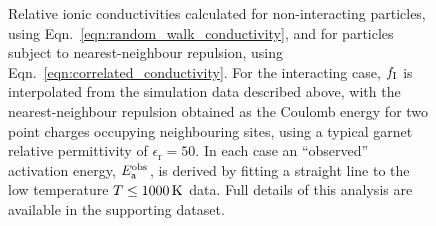 \documentclass[aps,prb,twocolumn,superscriptaddress,reprint]{revtex4-1}
\begin{document}
\begin{figure}[tb]
  \centering
    \caption{\label{fig:arrhenius_example}Relative ionic conductivities calculated for non-interacting particles, using Eqn.~\ref{eqn:random_walk_conductivity}, and for particles subject to nearest-neighbour repulsion, using Eqn.~\ref{eqn:correlated_conductivity}. For the interacting case, $f_{\mathrm{I}}$ is interpolated from the simulation data described above, with the nearest-neighbour repulsion obtained as the Coulomb energy for two point charges occupying neighbouring sites, using a typical garnet relative permittivity of $\epsilon_\mathrm{r}=50$.\cite{RettenwanderEtAl_InorgChem2015} In each case an ``observed'' activation energy, $E_{\mathrm{a}}^{\mathrm{obs}}$, is derived by fitting a straight line to the low temperature $T\leq1000\,\mathrm{K}$ data. Full details of this analysis are available in the supporting dataset.\cite{garnet_LGMC_dataset_2017}}
\end{figure}
\end{document}
